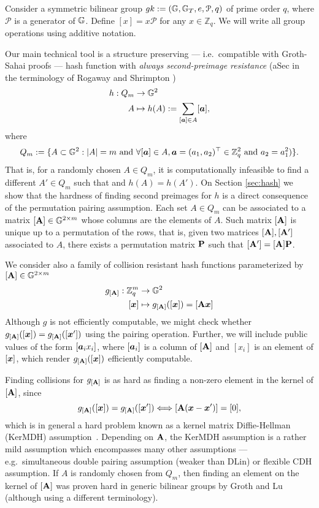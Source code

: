 Consider a symmetric bilinear group $gk:=(\mathbb{G},\mathbb{G}_T,e,\mathcal{P},q)$ of prime order $q$, where $\mathcal{P}$ is a generator of $\mathbb{G}$. Define $[x]=x\mathcal{P}$ for any $x\in\mathbb{Z}_q$.  We will write all group operations using additive notation.

Our main technical tool is a structure preserving --- i.e.~compatible with Groth-Sahai proofs --- hash function with \emph{always second-preimage resistance} (aSec in the terminology of Rogaway and Shrimpton \cite{FSE:RogShr04})
\begin{align*}
h : Q_m &\to \mathbb{G}^2\\
      A &\mapsto h(A) := \sum_{[{\boldsymbol{a}}]\in A} [{\boldsymbol{a}}],
\end{align*}
 where
$$
Q_m:= \{A\subset\mathbb{G}^2: |A|=m \text{ and }\forall [{\boldsymbol{a}}]\in A, {\boldsymbol{a}}=(a_1,a_2)^\top\in\mathbb{Z}_q^2 \text{ and } a_2=a_1^2)\}.
$$
That is, for a randomly chosen $A\in Q_m$, it is computationally infeasible to find a different $A'\in Q_m$ such that and $h(A)=h(A')$. On Section \ref{sec:hash} we show that the hardness of finding second preimages for $h$ is a direct consequence of the permutation pairing assumption.
Each set $A\in Q_m$  can be associated to a matrix $[\mathbf{{A}}]\in \mathbb{G}^{2\times m}$ whose columns are the elements of $A$. Such matrix $[\mathbf{{A}}]$ is unique up to a permutation of the rows, that is, given two matrices $[\mathbf{{A}}],[\mathbf{{A}}']$ associated to $A$, there exists a permutation matrix $\mathbf{{P}}$ such that $[\mathbf{{A}}'] = [\mathbf{{A}}]\mathbf{{P}}$.

We consider also a family of collision resistant hash functions parameterized by $[\mathbf{{A}}]\in\mathbb{G}^{2\times m}$
\begin{align*}
g_{[\matr{A}]} : \Z_q^m &\to \GG^2\\
           [\vecb{x}] &\mapsto g_{[\matr{A}]}([\vecb{x}]) = [\matr{A}\vecb{x}]
\end{align*}
Although $g$ is not efficiently computable, we might check whether $g_{[\mathbf{{A}}]}([{\boldsymbol{x}}])=g_{[\mathbf{{A}}]}([{\boldsymbol{x}}'])$ using the pairing operation. Further, we will include public values of the form $[{\boldsymbol{a}}_ix_i]$, where $[{\boldsymbol{a}}_i]$ is a column of $[\mathbf{{A}}]$ and $[x_i]$ is an element of $[{\boldsymbol{x}}]$, which render  $g_{[\mathbf{{A}}]}([{\boldsymbol{x}}])$ efficiently computable.

Finding collisions for $g_{[\mathbf{{A}}]}$ is as hard as finding a non-zero element in the kernel of $[\mathbf{{A}}]$, since
$$
g_{[\mathbf{{A}}]}([{\boldsymbol{x}}]) = g_{[\mathbf{{A}}]}([{\boldsymbol{x}}']) \Longleftrightarrow [\mathbf{{A}}({\boldsymbol{x}}-{\boldsymbol{x}}')]=[0],
$$
which is in general a hard problem known as a kernel matrix Diffie-Hellman (KerMDH) assumption~\cite{AC:MorRafVil16}. Depending on $\mathbf{{A}}$, the KerMDH assumption is a rather mild assumption which encompasses many other assumptions --- e.g.~simultaneous double pairing assumption (weaker than DLin) or flexible CDH assumption. If $A$ is randomly chosen from $Q_m$, then finding an element on the kernel of $[\mathbf{{A}}]$ was proven hard in generic bilinear groups by Groth and Lu \cite{AC:GroLu07} (although using a different terminology).


